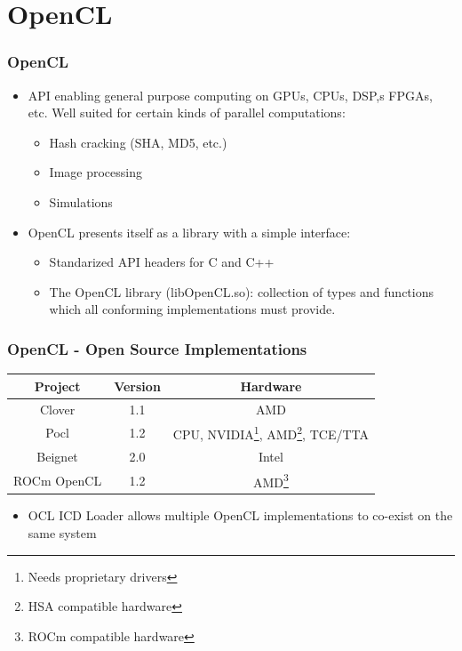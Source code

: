 \documentclass{smilebeamer}
\begin{document}
\section{OpenCL}
\begin{frame}
\frametitle{OpenCL}
\begin{itemize}
  \item API enabling general purpose computing on GPUs, CPUs, DSP,s FPGAs, etc.
  Well suited for certain kinds of parallel computations:
  \begin{itemize}
    \item Hash cracking (SHA, MD5, etc.)
    \item Image processing
    \item Simulations
  \end{itemize}
  \item OpenCL presents itself as a library with a simple interface:
  \begin{itemize}
    \item Standarized API headers for C and C++
    \item The OpenCL library (libOpenCL.so): collection of types and functions
    which all conforming implementations must provide.
  \end{itemize}
\end{itemize}
\end{frame}

\begin{frame}
\frametitle{OpenCL - Open Source Implementations}
\centering
{
\begin{tabular}{c|c|c}
\textbf{Project} & \textbf{Version} & \textbf{Hardware} \\
\hline
Clover & 1.1 & AMD\\
Pocl & 1.2 & CPU, NVIDIA\footnote{Needs proprietary drivers}, AMD\footnote{HSA
compatible hardware}, TCE/TTA\\
Beignet & 2.0 & Intel\\
ROCm OpenCL & 1.2 & AMD\footnote{ROCm compatible hardware}\\
\end{tabular}
}
\vfill
\begin{itemize}
  \item OCL ICD Loader allows multiple OpenCL implementations to co-exist on
  the same system
\end{itemize}
\end{frame}
\end{document}
